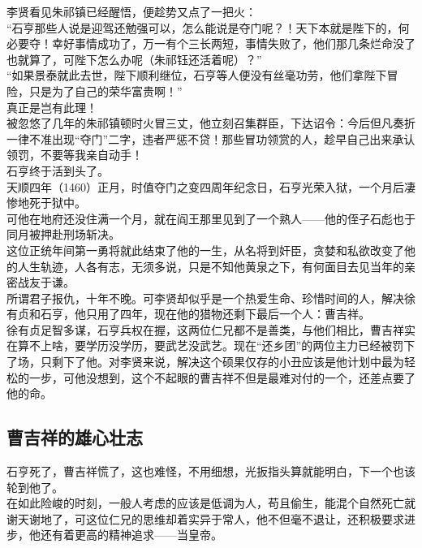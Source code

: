 \begin{multicols}{\theparacolNo}
李贤看见朱祁镇已经醒悟，便趁势又点了一把火：\\

“石亨那些人说是迎驾还勉强可以，怎么能说是夺门呢？！天下本就是陛下的，何必要夺！幸好事情成功了，万一有个三长两短，事情失败了，他们那几条烂命没了也就算了，可陛下怎么办呢（朱祁钰还活着呢）？”\\

“如果景泰就此去世，陛下顺利继位，石亨等人便没有丝毫功劳，他们拿陛下冒险，只是为了自己的荣华富贵啊！”\\

真正是岂有此理！\\

被忽悠了几年的朱祁镇顿时火冒三丈，他立刻召集群臣，下达诏令：今后但凡奏折一律不准出现“夺门”二字，违者严惩不贷！那些冒功领赏的人，趁早自己出来承认领罚，不要等我亲自动手！\\

石亨终于活到头了。\\

天顺四年（1460）正月，时值夺门之变四周年纪念日，石亨光荣入狱，一个月后凄惨地死于狱中。\\

可他在地府还没住满一个月，就在阎王那里见到了一个熟人——他的侄子石彪也于同月被押赴刑场斩决。\\

这位正统年间第一勇将就此结束了他的一生，从名将到奸臣，贪婪和私欲改变了他的人生轨迹，人各有志，无须多说，只是不知他黄泉之下，有何面目去见当年的亲密战友于谦。\\

所谓君子报仇，十年不晚。可李贤却似乎是一个热爱生命、珍惜时间的人，解决徐有贞和石亨，他只用了四年，现在他的猎物还剩下最后一个人：曹吉祥。\\

徐有贞足智多谋，石亨兵权在握，这两位仁兄都不是善类，与他们相比，曹吉祥实在算不上啥，要学历没学历，要武艺没武艺。现在“还乡团”的两位主力已经被罚下了场，只剩下了他。对李贤来说，解决这个硕果仅存的小丑应该是他计划中最为轻松的一步，可他没想到，这个不起眼的曹吉祥不但是最难对付的一个，还差点要了他的命。\\

\subsection{曹吉祥的雄心壮志}
石亨死了，曹吉祥慌了，这也难怪，不用细想，光扳指头算就能明白，下一个也该轮到他了。\\

在如此险峻的时刻，一般人考虑的应该是低调为人，苟且偷生，能混个自然死亡就谢天谢地了，可这位仁兄的思维却着实异于常人，他不但毫不退让，还积极要求进步，他还有着更高的精神追求——当皇帝。\\


\end{multicols}
